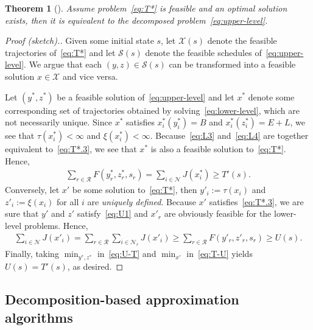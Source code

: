 \documentclass{report}
\theoremstyle{definition}
\theoremstyle{plain}
\newtheorem{theorem}{Theorem}[chapter]
\begin{document}
\begin{theorem}[{\cite[Theorem 1]{hultTechnicalReportApproximate}}]\label{thm:decomposition}
  Assume problem~\eqref{eq:T*} is feasible and an optimal solution exists, then it is
  equivalent to the decomposed problem~\eqref{eq:upper-level}.
\end{theorem}
\begin{proof}[Proof (sketch).]
  Given some initial state $s$, let $\mathcal{X}(s)$ denote the feasible
  trajectories of~\eqref{eq:T*} and let $\mathcal{S}(s)$ denote the feasible
  schedules of~\eqref{eq:upper-level}. We argue that each
  $(y,z) \in \mathcal{S}(s)$ can be transformed into a feasible solution
  $x \in \mathcal{X}$ and vice versa.

  Let $(y^*,z^*)$ be a feasible solution of~\eqref{eq:upper-level} and let $x^*$ denote some
  corresponding set of trajectories obtained by solving~\eqref{eq:lower-level}, which are not
  necessarily unique. Since $x^*$ satisfies $x^*_{i}(y^*_{i}) = B$ and
  $x^*_{i}(z^*_{i}) = E + L$, we see that $\tau(x^*_{i}) < \infty$ and $\xi(x^*_{i}) < \infty$.
  Because~\eqref{eq:L3} and~\eqref{eq:L4} are together equivalent to~\eqref{eq:T*.3}, we see that $x^*$ is also
  a feasible solution to~\eqref{eq:T*}. Hence,
  \begin{align}\label{eq:U-T}
    \sum_{r \in \mathcal{R}} F(y^*_r, z^*_r, s_r) = \sum_{i \in \mathcal{N}} J(x^*_i) \geq T'(s) .
  \end{align}
  Conversely, let $x'$ be some solution to~\eqref{eq:T*}, then $y'_{i} := \tau(x_{i})$ and
  $z'_{i} := \xi(x_{i})$ for all $i$ are \emph{uniquely defined}. Because $x'$
  satisfies~\eqref{eq:T*.3}, we are sure that $y'$ and $z'$ satisfy~\eqref{eq:U1} and $x'_{r}$ are
  obviously feasible for the lower-level problems. Hence,
  \begin{align}\label{eq:T-U}
    \sum_{i \in \mathcal{N}} J(x'_i) = \sum_{r \in \mathcal{R}} \sum_{i \in \mathcal{N}_r} J(x'_i)
    \geq \sum_{r \in \mathcal{R}} F(y'_r, z'_r, s_r)
    \geq U(s) .
  \end{align}
  Finally, taking $\min_{y^*,z^*}$ in~\eqref{eq:U-T} and $\min_{x'}$ in~\eqref{eq:T-U}
  yields $U(s) = T'(s)$, as desired.
\end{proof}


\subsection{Decomposition-based approximation algorithms}\label{sec:approx-algos}
\end{document}
